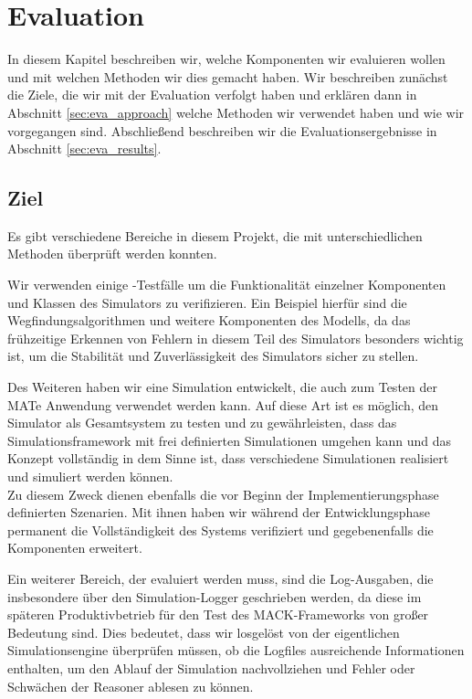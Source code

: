 \chapter{Evaluation}\label{chapter:eval}
In diesem Kapitel beschreiben wir, welche Komponenten wir evaluieren wollen und mit welchen Methoden wir dies gemacht haben. Wir beschreiben zunächst die Ziele, die wir mit der Evaluation verfolgt haben und erklären dann in Abschnitt \ref{sec:eva_approach} welche Methoden wir verwendet haben und wie wir vorgegangen sind.
Abschließend beschreiben wir die Evaluationsergebnisse in Abschnitt \ref{sec:eva_results}.
\section{Ziel}\label{sec:eva_goal}
Es gibt verschiedene Bereiche in diesem Projekt, die mit unterschiedlichen Methoden überprüft werden konnten.

Wir verwenden einige -Testfälle um die Funktionalität einzelner Komponenten und Klassen des Simulators zu verifizieren. Ein Beispiel hierfür sind die Wegfindungsalgorithmen und weitere Komponenten des Modells, da das frühzeitige Erkennen von Fehlern in diesem Teil des Simulators besonders wichtig ist, um die Stabilität und Zuverlässigkeit des Simulators sicher zu stellen.

Des Weiteren haben wir eine Simulation entwickelt, die auch zum Testen der MATe Anwendung verwendet werden kann. Auf diese Art ist es möglich, den Simulator als Gesamtsystem zu testen und zu gewährleisten, dass das Simulationsframework mit frei definierten Simulationen umgehen kann und das Konzept vollständig in dem Sinne ist, dass verschiedene Simulationen realisiert und simuliert werden können.\\
Zu diesem Zweck dienen ebenfalls die vor Beginn der Implementierungsphase definierten Szenarien. Mit ihnen haben wir während der Entwicklungsphase permanent die Vollständigkeit des Systems verifiziert und gegebenenfalls die Komponenten erweitert.

Ein weiterer Bereich, der evaluiert werden muss, sind die Log-Ausgaben, die insbesondere über den Simulation-Logger geschrieben werden, da diese im späteren Produktivbetrieb für den Test des MACK-Frameworks von großer Bedeutung sind. Dies bedeutet, dass wir losgelöst von der eigentlichen Simulationsengine überprüfen müssen, ob die Logfiles ausreichende Informationen enthalten, um den Ablauf der Simulation nachvollziehen und Fehler oder Schwächen der Reasoner ablesen zu können.

